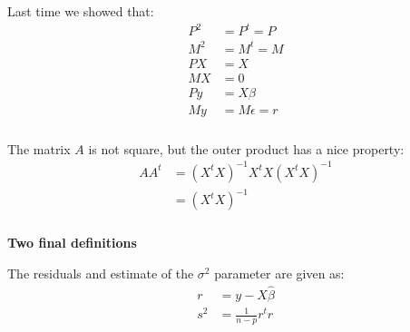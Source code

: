 \begin{frame}[fragile] \frametitle{}

Last time we showed that:
\begin{align*}
P^2 &= P^t = P \\
M^2 &= M^t = M \\
PX &= X \\
MX &= 0 \\
Py &= X\beta \\
My &= M\epsilon = r
\end{align*}

\end{frame}

\begin{frame}[fragile] \frametitle{}

The matrix $A$ is not square, but the outer product
has a nice property:
\begin{align*}
AA^t &= (X^t X)^{-1} X^t X (X^t X)^{-1} \\
&= (X^t X)^{-1}
\end{align*}

\end{frame}

\begin{frame}[fragile] \frametitle{}

{\bf Two final definitions}

The residuals and estimate of the $\sigma^2$ parameter
are given as:
\begin{align*}
r &= y - X\widehat{\beta} \\
s^2 &= \frac{1}{n-p} r^t r
\end{align*}

\end{frame}


